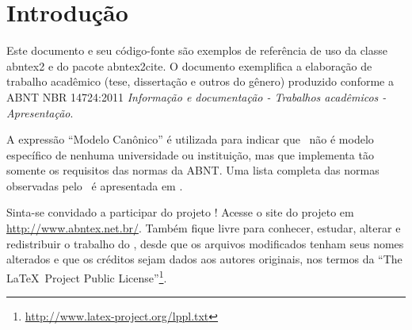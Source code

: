 \documentclass[
	12pt,				%
	openright,			%
	oneside,			%
	a4paper,			%
	chapter=TITLE,		%
	english,			%
	french,				%
	spanish,			%
	brazil				%
	]{abntex2}
\theoremstyle{definition}
\begin{document}
\begin{agradecimentos}



\end{agradecimentos}

\begin{epigrafe}
    


\end{epigrafe}







\tableofcontents*
\cleardoublepage



\textual

\chapter{Introdução}
\label{cap:introducao}

Este documento e seu código-fonte são exemplos de referência de uso da classe
\textsf{abntex2} e do pacote \textsf{abntex2cite}. O documento 
exemplifica a elaboração de trabalho acadêmico (tese, dissertação e outros do
gênero) produzido conforme a ABNT NBR 14724:2011 \emph{Informação e documentação
- Trabalhos acadêmicos - Apresentação}.

A expressão ``Modelo Canônico'' é utilizada para indicar que \abnTeX\ não é
modelo específico de nenhuma universidade ou instituição, mas que implementa tão
somente os requisitos das normas da ABNT. Uma lista completa das normas
observadas pelo \abnTeX\ é apresentada em .

Sinta-se convidado a participar do projeto \abnTeX! Acesse o site do projeto em
\url{http://www.abntex.net.br/}. Também fique livre para conhecer,
estudar, alterar e redistribuir o trabalho do \abnTeX, desde que os arquivos
modificados tenham seus nomes alterados e que os créditos sejam dados aos
autores originais, nos termos da ``The \LaTeX\ Project Public
License''\footnote{\url{http://www.latex-project.org/lppl.txt}}.
\end{document}
